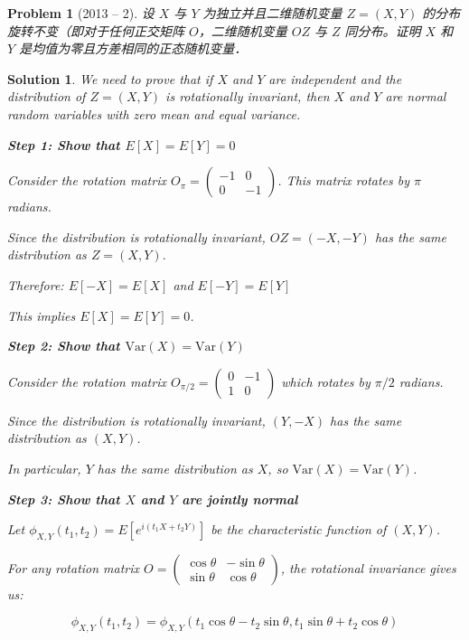 \documentclass[12pt]{amsart}
\newtheorem{problem}{Problem}
\newtheorem*{solution}{Solution}
\begin{document}
\begin{problem}[2013 -- 2]
设 $X$ 与 $Y$ 为独立并且二维随机变量 $Z=(X, Y)$ 的分布旋转不变（即对于任何正交矩阵 $O$，二维随机变量 $O Z$ 与 $Z$ 同分布。证明 $X$ 和 $Y$ 是均值为零且方差相同的正态随机变量．
\end{problem}

\begin{solution}
We need to prove that if $X$ and $Y$ are independent and the distribution of $Z = (X,Y)$ is rotationally invariant, then $X$ and $Y$ are normal random variables with zero mean and equal variance.

\textbf{Step 1: Show that $E[X] = E[Y] = 0$}

Consider the rotation matrix $O_\pi = \begin{pmatrix} -1 & 0 \\ 0 & -1 \end{pmatrix}$. This matrix rotates by $\pi$ radians.

Since the distribution is rotationally invariant, $OZ = (-X, -Y)$ has the same distribution as $Z = (X, Y)$.

Therefore: $E[-X] = E[X]$ and $E[-Y] = E[Y]$

This implies $E[X] = E[Y] = 0$.

\textbf{Step 2: Show that $\mathrm{Var}(X) = \mathrm{Var}(Y)$}

Consider the rotation matrix $O_{\pi/2} = \begin{pmatrix} 0 & -1 \\ 1 & 0 \end{pmatrix}$ which rotates by $\pi/2$ radians.

Since the distribution is rotationally invariant, $(Y, -X)$ has the same distribution as $(X, Y)$.

In particular, $Y$ has the same distribution as $X$, so $\mathrm{Var}(X) = \mathrm{Var}(Y)$.

\textbf{Step 3: Show that $X$ and $Y$ are jointly normal}

Let $\phi_{X,Y}(t_1, t_2) = E[e^{i(t_1 X + t_2 Y)}]$ be the characteristic function of $(X,Y)$.

For any rotation matrix $O = \begin{pmatrix} \cos\theta & -\sin\theta \\ \sin\theta & \cos\theta \end{pmatrix}$, the rotational invariance gives us:

$$\phi_{X,Y}(t_1, t_2) = \phi_{X,Y}(t_1\cos\theta - t_2\sin\theta, t_1\sin\theta + t_2\cos\theta)$$


\end{solution}
\end{document}
